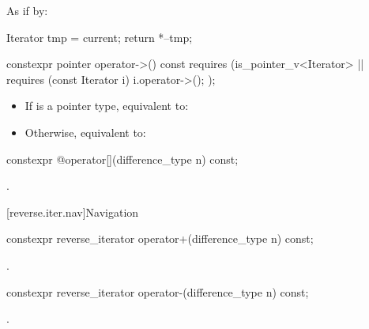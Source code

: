 \begin{itemdescr}
\pnum
\effects
As if by:
\begin{codeblock}
Iterator tmp = current;
return *--tmp;
\end{codeblock}

\end{itemdescr}

%
\begin{itemdecl}
constexpr pointer operator->() const
  requires (is_pointer_v<Iterator> ||
            requires (const Iterator i) { i.operator->(); });
\end{itemdecl}

\begin{itemdescr}
\pnum
\effects
\begin{itemize}
\item If  is a pointer type, equivalent to:

\item Otherwise, equivalent to:
\end{itemize}
\end{itemdescr}

%
\begin{itemdecl}
constexpr @\unspec@ operator[](difference_type n) const;
\end{itemdecl}

\begin{itemdescr}
\pnum
\returns
{}.
\end{itemdescr}

[reverse.iter.nav]{Navigation}

%
\begin{itemdecl}
constexpr reverse_iterator operator+(difference_type n) const;
\end{itemdecl}

\begin{itemdescr}
\pnum
\returns
{}.
\end{itemdescr}

%
\begin{itemdecl}
constexpr reverse_iterator operator-(difference_type n) const;
\end{itemdecl}

\begin{itemdescr}
\pnum
\returns
{}.
\end{itemdescr}

